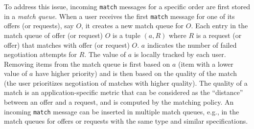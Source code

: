 To address this issue, incoming \texttt{match} messages for a specific order are first stored in a \emph{match queue}.
When a user receives the first \texttt{match} message for one of its offers (or requests), say $ O $, it creates a new match queue for $ O $.
Each entry in the match queue of offer (or request) $ O $ is a tuple $ (a, R) $ where $ R $ is a request (or offer) that matches with offer (or request) $ O $.
$ a $ indicates the number of failed negotiation attempts for $ R $.
The value of $ a $ is locally tracked by each user.
Removing items from the match queue is first based on $ a $ (item with a lower value of $ a $ have higher priority) and is then based on the quality of the match (the user prioritizes negotiation of matches with higher quality).
The quality of a match is an application-specific metric that can be considered as the \enquote{distance} between an offer and a request, and is computed by the matching policy.
An incoming \texttt{match} message can be inserted in multiple match queues, e.g., in the match queues for offers or requests with the same type and similar specifications.

